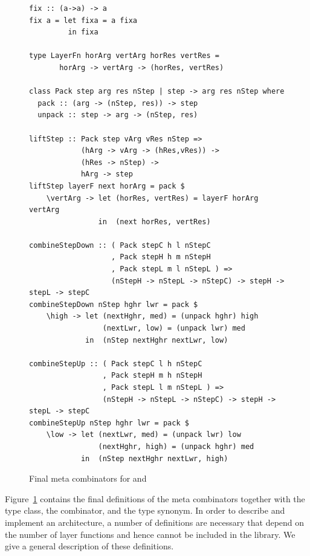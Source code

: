 \documentclass[preprint,natbib]{sigplanconf}
\begin{document}
\begin{figure}
\begin{small}
\begin{center}
\begin{footnotesize}
\begin{verbatim}
fix :: (a->a) -> a
fix a = let fixa = a fixa
         in fixa

type LayerFn horArg vertArg horRes vertRes =
       horArg -> vertArg -> (horRes, vertRes)

class Pack step arg res nStep | step -> arg res nStep where
  pack :: (arg -> (nStep, res)) -> step
  unpack :: step -> arg -> (nStep, res)

liftStep :: Pack step vArg vRes nStep => 
            (hArg -> vArg -> (hRes,vRes)) ->
            (hRes -> nStep) ->
            hArg -> step
liftStep layerF next horArg = pack $
    \vertArg -> let (horRes, vertRes) = layerF horArg vertArg
                in  (next horRes, vertRes)                    

combineStepDown :: ( Pack stepC h l nStepC 
                   , Pack stepH h m nStepH
                   , Pack stepL m l nStepL ) => 
                   (nStepH -> nStepL -> nStepC) -> stepH -> stepL -> stepC
combineStepDown nStep hghr lwr = pack $
    \high -> let (nextHghr, med) = (unpack hghr) high
                 (nextLwr, low) = (unpack lwr) med
             in  (nStep nextHghr nextLwr, low)

combineStepUp :: ( Pack stepC l h nStepC 
                 , Pack stepH m h nStepH
                 , Pack stepL l m nStepL ) => 
                 (nStepH -> nStepL -> nStepC) -> stepH -> stepL -> stepC
combineStepUp nStep hghr lwr = pack $
    \low -> let (nextLwr, med) = (unpack lwr) low
                (nextHghr, high) = (unpack hghr) med
            in  (nStep nextHghr nextLwr, high)
\end{verbatim} %
\end{footnotesize}\caption{Final meta combinators for  and }\label{metacombinators} 
\end{center}
\end{small}
\end{figure}


Figure~\ref{metacombinators} contains the final definitions of the meta combinators together with the  type class, the  combinator, and the  type synonym. In order to describe and implement an architecture, a number of definitions are necessary that depend on the number of layer functions and hence cannot be included in the library. We give a general description of these definitions.
\end{document}
